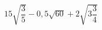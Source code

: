 \begin{ex}[type=expression]
	\begin{condition}
		\( 15\sqrt{\dfrac{3}{5}}-0,5\sqrt{60}+2\sqrt{3\dfrac{3}{4}} \)
	\end{condition}
\end{ex}